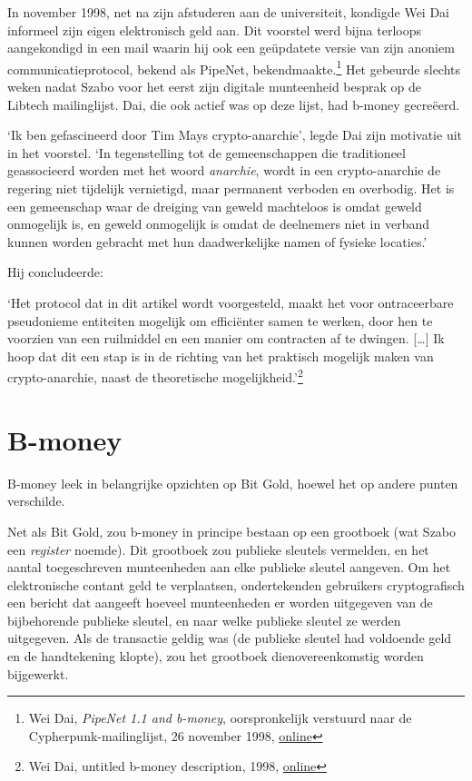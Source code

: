 \documentclass[
  a5paper,
  smalldemyvopaper,11pt,twoside,onecolumn,openright,extrafontsizes,
hidelinks]{memoir}
\renewenvironment{quote}%
               {\list{}{\rightmargin=.3cm\leftmargin=.3cm}%
                \itshape \item[]}%
               {\endlist}
\begin{document}
In november 1998, net na zijn afstuderen aan de universiteit, kondigde
Wei Dai informeel zijn eigen elektronisch geld aan. Dit voorstel werd
bijna terloops aangekondigd in een mail waarin hij ook een geüpdatete
versie van zijn anoniem communicatieprotocol, bekend als PipeNet,
bekendmaakte.\footnote{Wei Dai, \emph{PipeNet 1.1 and b-money},
  oorspronkelijk verstuurd naar de Cypherpunk-mailinglijst, 26 november
  1998,
  \href{https://cypherpunks.venona.com/date/1998/11/msg00941.html}{online}}
Het gebeurde slechts weken nadat Szabo voor het eerst zijn digitale
munteenheid besprak op de Libtech mailinglijst. Dai, die ook actief was
op deze lijst, had b-money gecreëerd.

`Ik ben gefascineerd door Tim Mays crypto-anarchie', legde Dai zijn
motivatie uit in het voorstel. `In tegenstelling tot de gemeenschappen
die traditioneel geassocieerd worden met het woord \emph{anarchie},
wordt in een crypto-anarchie de regering niet tijdelijk vernietigd, maar
permanent verboden en overbodig. Het is een gemeenschap waar de dreiging
van geweld machteloos is omdat geweld onmogelijk is, en geweld
onmogelijk is omdat de deelnemers niet in verband kunnen worden gebracht
met hun daadwerkelijke namen of fysieke locaties.'

Hij concludeerde:

\begin{quote}
`Het protocol dat in dit artikel wordt voorgesteld, maakt het voor
ontraceerbare pseudonieme entiteiten mogelijk om efficiënter samen te
werken, door hen te voorzien van een ruilmiddel en een manier om
contracten af te dwingen. {[}\ldots{]} Ik hoop dat dit een stap is in de
richting van het praktisch mogelijk maken van crypto-anarchie, naast de
theoretische mogelijkheid.'\footnote{Wei Dai, untitled b-money
  description, 1998,
  \href{https://web.archive.org/web/20090415130807/https://www.weidai.com/bmoney.txt}{online}}
\end{quote}

\section{B-money}\label{b-money}

B-money leek in belangrijke opzichten op Bit Gold, hoewel het op andere
punten verschilde.

Net als Bit Gold, zou b-money in principe bestaan op een grootboek (wat
Szabo een \emph{register} noemde). Dit grootboek zou publieke sleutels
vermelden, en het aantal toegeschreven munteenheden aan elke publieke
sleutel aangeven. Om het elektronische contant geld te verplaatsen,
ondertekenden gebruikers cryptografisch een bericht dat aangeeft hoeveel
munteenheden er worden uitgegeven van de bijbehorende publieke sleutel,
en naar welke publieke sleutel ze werden uitgegeven. Als de transactie
geldig was (de publieke sleutel had voldoende geld en de handtekening
klopte), zou het grootboek dienovereenkomstig worden bijgewerkt.
\end{document}
